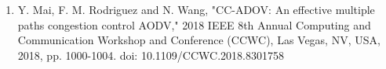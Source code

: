 \documentclass[12pt,a4paper]{article}
\begin{document}
\begin{enumerate}
    \item Y. Mai, F. M. Rodriguez and N. Wang, "CC-ADOV: An effective multiple paths congestion control AODV," 2018 IEEE 8th Annual Computing and Communication Workshop and Conference (CCWC), Las Vegas, NV, USA, 2018, pp. 1000-1004. doi: 10.1109/CCWC.2018.8301758
    
    
    
    
    
    
    
\end{enumerate}
\end{document}
